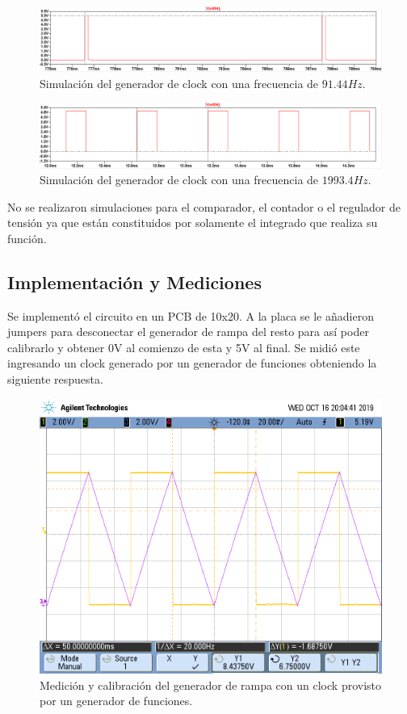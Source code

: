 \begin{figure}[H]
\centering
\includegraphics[width=\textwidth]{Imagenes/clockgen1.png}
\caption{Simulación del generador de clock con una frecuencia de $91.44Hz$.}
\label{sim:gen1}
\end{figure}
\begin{figure}[H]
\centering
\includegraphics[width=\textwidth]{Imagenes/clockgen2.png}
\caption{Simulación del generador de clock con una frecuencia de $1993.4Hz$.}
\label{sim:gen2}
\end{figure}

No se realizaron simulaciones para el comparador, el contador o el regulador de tensión ya que están constituidos por solamente el integrado que realiza su función.

\subsection{Implementación y Mediciones}
Se implementó el circuito en un PCB de 10x20. A la placa se le añadieron jumpers para desconectar el generador de rampa del resto para así poder calibrarlo y obtener 0V al comienzo de esta y 5V al final. Se midió este ingresando un clock generado por un generador de funciones obteniendo la siguiente respuesta.

\begin{figure}[H]
\centering
\includegraphics[width=\textwidth,trim={0 2.2cm 0.1cm 1.75cm},clip]{Imagenes/ramp.png}
\caption{Medición y calibración del generador de rampa con un clock provisto por un generador de funciones.}
\label{med:ramp}
\end{figure}

